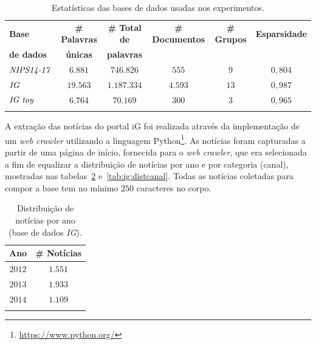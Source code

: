 \documentclass[
    12pt,                %
    oneside,            %
    a4paper,            %
    english,            %
    brazil                %
    ]{abntex2ppgsi}
\begin{document}
\begin{table}[h]
    \centering
    \caption{Estatísticas das bases de dados usadas nos experimentos.}
    \begin{tabular}{lccccc}
        \hline
        \textbf{Base}     & \textbf{\# Palavras} & \textbf{\# Total de} & \textbf{\# Documentos} & \textbf{\# Grupos} & \textbf{Esparsidade} \\
        \textbf{de dados} & \textbf{únicas}      & \textbf{palavras}    &               &           &             \\
        \hline
        $\text{\textit{NIPS14-17}}$ & $6.881$  & $746.826$   & $555$   & $9$  & $0,804$ \\
        $\text{\textit{IG}}$        & $19.563$ & $1.187.334$ & $4.593$ & $13$ & $0,987$ \\
        $\text{\textit{IG toy}}$    & $6.764$  & $70.169$    & $300$   & $3$  & $0,965$ \\
        \hline
        & & & & & \\
        \end{tabular}
    \label{tab:datasetsstatsREAL}
\end{table}

A extração das notícias do portal iG foi realizada através da implementação de um \textit{web crawler} utilizando a linguagem Python\footnote{\url{https://www.python.org/}}.
As notícias foram capturadas a partir de uma página de início, fornecida para o \textit{web crawler}, que era selecionada a fim de equalizar a distribuição de notícias por ano e por categoria (canal), mostradas nas tabelas~\ref{tab:ig:distano} e~\ref{tab:ig:distcanal}.
Todas as notícias coletadas para compor a base tem no mínimo $250$ caracteres no corpo.

\begin{table}[h]
\centering
\caption{Distribuição de notícias por ano (base de dados \textit{IG}).}
    \begin{tabular}{cc}
        \hline
        Ano & \# Notícias \\
        \hline
        $2012$ & $1.551$ \\
        $2013$ & $1.933$ \\
        $2014$ & $1.109$ \\
        \hline
        & \\
    \end{tabular}
    \label{tab:ig:distano}
\end{table}
\end{document}
